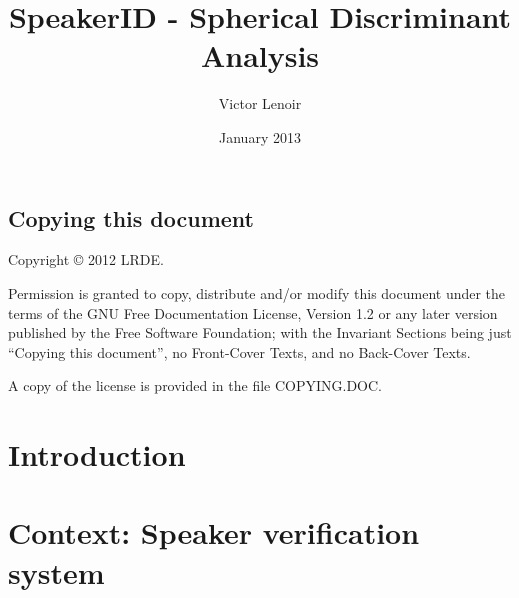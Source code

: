 \documentclass{techrep} %
\title{SpeakerID - Spherical Discriminant Analysis}
\author{Victor Lenoir} \revision$LastChangedRevision: 2340 $
\date{January 2013} \email{lenoir@lrde.epita.fr}
\begin{document}
\section*{Copying this document}
Copyright \copyright{} 2012 LRDE.

Permission is granted to copy, distribute and/or modify this document
under the terms of the GNU Free Documentation License, Version 1.2 or
any later version published by the Free Software Foundation; with the
Invariant Sections being just ``Copying this document'', no
Front-Cover Texts, and no Back-Cover Texts.

A copy of the license is provided in the file COPYING.DOC.

\tableofcontents

\newpage
\chapter*{Introduction}
\chapter{Context: Speaker verification system}


\end{document}
